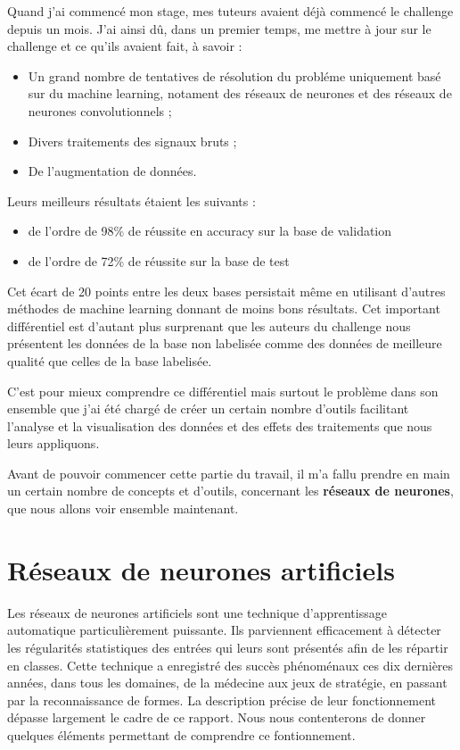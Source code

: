 Quand j'ai commencé mon stage, mes tuteurs avaient déjà commencé le challenge depuis un mois. J'ai ainsi dû, dans un premier temps, me mettre à jour
sur le challenge et ce qu'ils avaient fait, à savoir :

\begin{itemize}
\item Un grand nombre de tentatives de résolution du probléme uniquement basé sur du machine learning, notament des réseaux de neurones et des réseaux de neurones convolutionnels ;
\item Divers traitements des signaux bruts ;
\item De l'augmentation de données.
\end{itemize}

Leurs meilleurs résultats étaient les suivants :
\begin{itemize}
  \item de l'ordre de 98\% de réussite en accuracy sur la base de validation
  \item de l'ordre de 72\% de réussite sur la base de test
\end{itemize}

Cet écart de 20 points entre les deux bases persistait même en utilisant
d'autres méthodes de machine learning donnant de moins bons résultats.
Cet important différentiel est d'autant plus surprenant que les auteurs du
challenge nous présentent les données de la base non labelisée comme des données
de meilleure qualité que celles de la base labelisée.

C'est pour mieux comprendre ce différentiel mais surtout le problème dans son
ensemble que j'ai été chargé de créer un certain nombre d'outils facilitant
l'analyse et la visualisation des données et des effets des traitements que
nous leurs appliquons.

Avant de pouvoir commencer cette partie du travail, il m'a fallu prendre en main
un certain nombre de concepts et d'outils, concernant les \textbf{réseaux de neurones}, que nous allons voir ensemble maintenant.

\hypertarget{Res-Neurone-artificiel}{%
\section{Réseaux de neurones artificiels}
\label{Res-Neurone-artificiel}}

Les réseaux de neurones artificiels sont une technique d'apprentissage automatique
particulièrement puissante.
Ils parviennent efficacement à détecter les régularités statistiques des entrées qui leurs sont présentés afin de les répartir en classes.
Cette technique a enregistré des succès phénoménaux ces dix dernières années, dans tous les domaines, de la médecine aux jeux de stratégie, en passant par la reconnaissance de formes.
La description précise de leur fonctionnement dépasse largement le cadre de ce rapport.
Nous nous contenterons de donner quelques éléments permettant de comprendre ce fontionnement.

